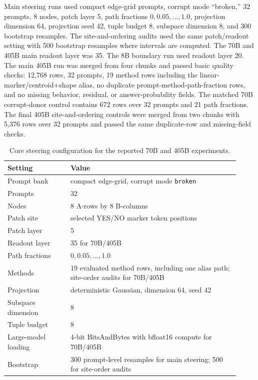 \documentclass[11pt]{article}
\begin{document}
Main steering runs used compact edge-grid prompts, corrupt mode ``broken,'' 32 prompts, 8 nodes, patch layer 5, path fractions $0,0.05,\ldots,1.0$, projection dimension 64, projection seed 42, tuple budget 8, subspace dimension 8, and 300 bootstrap resamples. The site-and-ordering audits used the same patch/readout setting with 500 bootstrap resamples where intervals are computed. The 70B and 405B main readout layer was 35. The 8B boundary run used readout layer 20. The main 405B run was merged from four chunks and passed basic quality checks: 12,768 rows, 32 prompts, 19 method rows including the linear-marker/centroid+shape alias, no duplicate prompt-method-path-fraction rows, and no missing behavior, residual, or answer-probability fields. The matched 70B corrupt-donor control contains 672 rows over 32 prompts and 21 path fractions. The final 405B site-and-ordering controls were merged from two chunks with 5,376 rows over 32 prompts and passed the same duplicate-row and missing-field checks.

\begin{table}[!htbp]
\centering
\small
\begin{tabular}{@{}p{0.25\linewidth}p{0.67\linewidth}@{}}
\toprule
Setting & Value \\
\midrule
Prompt bank & compact edge-grid, corrupt mode \texttt{broken} \\
Prompts & 32 \\
Nodes & 8 A-rows by 8 B-columns \\
Patch site & selected YES/NO marker token positions \\
Patch layer & 5 \\
Readout layer & 35 for 70B/405B \\
Path fractions & $0,0.05,\ldots,1.0$ \\
Methods & 19 evaluated method rows, including one alias path; site-order audits for 70B/405B \\
Projection & deterministic Gaussian, dimension 64, seed 42 \\
Subspace dimension & 8 \\
Tuple budget & 8 \\
Large-model loading & 4-bit BitsAndBytes with bfloat16 compute for 70B/405B \\
Bootstrap & 300 prompt-level resamples for main steering; 500 for site-order audits \\
\bottomrule
\end{tabular}
\caption{Core steering configuration for the reported 70B and 405B experiments.}
\label{tab:repro-config}
\end{table}
\FloatBarrier
\end{document}
